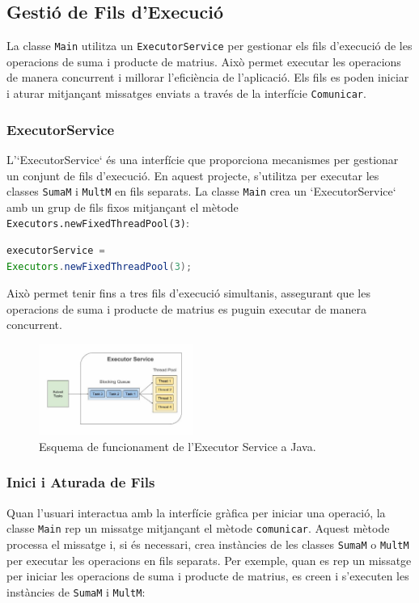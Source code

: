 \documentclass{ieeetj}
\begin{document}
\subsection{Gestió de Fils d'Execució}
La classe \texttt{Main} utilitza un \texttt{ExecutorService} per gestionar els fils d'execució de les operacions de suma i producte de matrius. Això permet executar les operacions de manera concurrent i millorar l'eficiència de l'aplicació. Els fils es poden iniciar i aturar mitjançant missatges enviats a través de la interfície \texttt{Comunicar}.

\subsubsection{ExecutorService}
L'`ExecutorService` és una interfície que proporciona mecanismes per gestionar un conjunt de fils d'execució. En aquest projecte, s'utilitza per executar les classes \texttt{SumaM} i \texttt{MultM} en fils separats. La classe \texttt{Main} crea un `ExecutorService` amb un grup de fils fixos mitjançant el mètode \texttt{Executors.newFixedThreadPool(3)}:

\begin{lstlisting}[language=Java, basicstyle=\ttfamily\normalsize]
executorService = 
Executors.newFixedThreadPool(3);
\end{lstlisting}

Això permet tenir fins a tres fils d'execució simultanis, assegurant que les operacions de suma i producte de matrius es puguin executar de manera concurrent.

\begin{figure}[htbp]
\centerline{\includegraphics[width=0.45\textwidth]{png/executorService.png}}
\caption{Esquema de funcionament de l'Executor Service a Java.}
\label{fig:exeServ}
\end{figure}

\subsubsection{Inici i Aturada de Fils}
Quan l'usuari interactua amb la interfície gràfica per iniciar una operació, la classe \texttt{Main} rep un missatge mitjançant el mètode \texttt{comunicar}. Aquest mètode processa el missatge i, si és necessari, crea instàncies de les classes \texttt{SumaM} o \texttt{MultM} per executar les operacions en fils separats. Per exemple, quan es rep un missatge per iniciar les operacions de suma i producte de matrius, es creen i s'executen les instàncies de \texttt{SumaM} i \texttt{MultM}:
\end{document}

